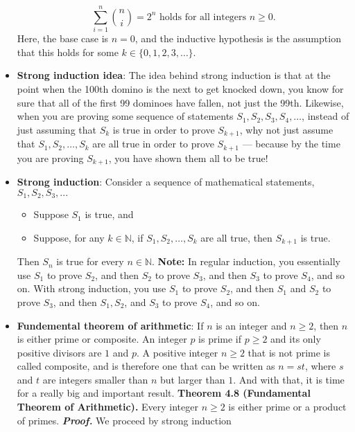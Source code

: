 \documentclass{report}
\begin{document}
\begin{itemize}
            \[
                \sum_{i=1}^n \binom{n}{i} = 2^n \text{ holds for all integers } n \geq 0.
            \]
            Here, the base case is $n = 0$, and the inductive hypothesis is the assumption that this holds for some $k \in \{0, 1, 2, 3, \ldots\}$.
        \item \textbf{Strong induction idea}: The idea behind strong induction is that at the point when the 100th domino is the  next to get knocked down, you know for sure that all of the first 99 dominoes have  fallen, not just the 99th. Likewise, when you are proving some sequence of statements  $S_1, S_2, S_3, S_4, \ldots$, instead of just assuming that $S_k$ is true in order to prove $S_{k+1}$,  why not just assume that $S_1, S_2, \ldots, S_k$ are all true in order to prove $S_{k+1}$ — because  by the time you are proving $S_{k+1}$, you have shown them all to be true!
        \item \textbf{Strong induction}: Consider a sequence of mathematical statements, $S_{1}, S_{2}, S_{3}, ...$
            \begin{itemize}
                \item Suppose $S_1$ is true, and  
                \item Suppose, for any $k \in \mathbb{N}$, if $S_1, S_2, \ldots, S_k$ are all true, then $S_{k+1}$ is true.
            \end{itemize}
            Then $S_n$ is true for every $n \in \mathbb{N}$.
            \bigbreak \noindent 
            \textbf{Note:} In regular induction, you essentially use $S_1$ to prove $S_2$, and then $S_2$ to prove $S_3$,  and then $S_3$ to prove $S_4$, and so on. With strong induction, you use $S_1$ to prove $S_2$,  and then $S_1$ and $S_2$ to prove $S_3$, and then $S_1, S_2$, and $S_3$ to prove $S_4$, and so on.
        \item \textbf{Fundemental theorem of arithmetic}: If $n$ is an integer and $n \geq 2$,  then $n$ is either prime or composite. An integer $p$ is prime if $p \geq 2$ and its only  positive divisors are $1$ and $p$. A positive integer $n \geq 2$ that is not prime is called  composite, and is therefore one that can be written as $n = st$, where $s$ and $t$ are  integers smaller than $n$ but larger than $1$. And with that, it is time for a really big  and important result.
            \bigbreak \noindent 
            \textbf{Theorem 4.8 (Fundamental Theorem of Arithmetic).}  Every integer $n \geq 2$ is either prime or a product of primes.
            \bigbreak \noindent 
            \textbf{\textit{Proof.}} We proceed by strong induction

\end{itemize}
\end{document}

